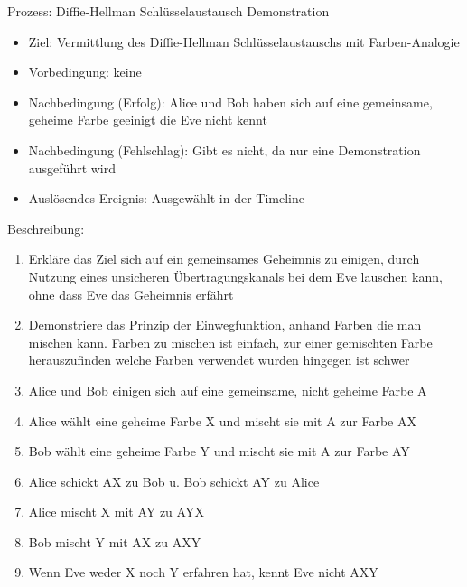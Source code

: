 \documentclass{article}
\begin{document}

\begin{FA}[start=100]
\item Prozess: Diffie-Hellman Schlüsselaustausch Demonstration
\end{FA}
\begin{itemize}[label={}]
    \item Ziel: Vermittlung des Diffie-Hellman Schlüsselaustauschs mit Farben-Analogie
    \item Vorbedingung: keine
    \item Nachbedingung (Erfolg): Alice und Bob haben sich auf eine
        gemeinsame, geheime Farbe geeinigt die Eve nicht kennt
    \item Nachbedingung (Fehlschlag): Gibt es nicht, da nur
        eine Demonstration ausgeführt wird
    \item Auslösendes Ereignis: Ausgewählt in der Timeline
\end{itemize}

Beschreibung:
\begin{enumerate}
    \item Erkläre das Ziel sich auf ein gemeinsames Geheimnis zu einigen,
        durch Nutzung eines unsicheren Übertragungskanals
        bei dem Eve lauschen kann, ohne dass Eve das Geheimnis erfährt
    \item Demonstriere das Prinzip der Einwegfunktion, anhand Farben die man mischen
        kann. Farben zu mischen ist einfach, zur einer gemischten Farbe
        herauszufinden welche Farben verwendet wurden hingegen ist schwer
    \item Alice und Bob einigen sich auf eine gemeinsame, nicht geheime Farbe A
    \item Alice wählt eine geheime Farbe X und mischt sie mit A zur Farbe AX
    \item Bob wählt eine geheime Farbe Y und mischt sie mit A zur Farbe AY
    \item Alice schickt AX zu Bob u. Bob schickt AY zu Alice
    \item Alice mischt X mit AY zu AYX
    \item Bob mischt Y mit AX zu AXY
    \item Wenn Eve weder X noch Y erfahren hat, kennt Eve nicht AXY
\end{enumerate}
\end{document}

